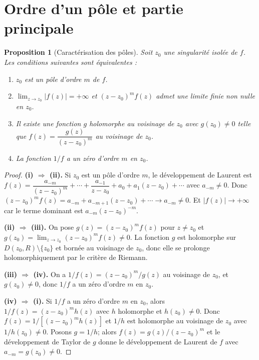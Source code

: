 \documentclass[12pt,a4paper,openany]{book}
\theoremstyle{definition}
\theoremstyle{plain}
\newtheorem{proposition}[definition]{Proposition}
\theoremstyle{remark}
\newcommand{\abs}[1]{\left|#1\right|}
\begin{document}
\section{Ordre d'un pôle et partie principale}

\begin{proposition}[Caractérisation des pôles]\label{prop:pole-char}
Soit $z_0$ une singularité isolée de $f$. Les conditions suivantes
sont équivalentes :
\begin{enumerate}[label=\textbf{(\roman*)}]
  \item $z_0$ est un pôle d'ordre $m$ de $f$.
  \item $\lim_{z \to z_0}\abs{f(z)} = +\infty$ et $(z-z_0)^m f(z)$
        admet une limite finie non nulle en $z_0$.
  \item Il existe une fonction $g$ holomorphe au voisinage de $z_0$
        avec $g(z_0) \neq 0$ telle que
        $f(z) = \dfrac{g(z)}{(z-z_0)^m}$ au voisinage de $z_0$.
  \item La fonction $1/f$ a un zéro d'ordre $m$ en $z_0$.
\end{enumerate}
\end{proposition}

\begin{proof}
\noindent\textbf{(i) $\Rightarrow$ (ii).} Si $z_0$ est un pôle d'ordre $m$,
le développement de Laurent est
$f(z) = \dfrac{a_{-m}}{(z-z_0)^m} + \cdots + \dfrac{a_{-1}}{z-z_0}
+ a_0 + a_1(z-z_0) + \cdots$
avec $a_{-m} \neq 0$. Donc
$(z-z_0)^m f(z) = a_{-m} + a_{-m+1}(z-z_0) + \cdots \to a_{-m} \neq 0$.
Et $\abs{f(z)} \to +\infty$ car le terme dominant est $a_{-m}(z-z_0)^{-m}$.

\medskip
\noindent\textbf{(ii) $\Rightarrow$ (iii).} On pose $g(z) = (z-z_0)^m f(z)$
pour $z \neq z_0$ et $g(z_0) = \lim_{z \to z_0}(z-z_0)^m f(z) \neq 0$.
La fonction $g$ est holomorphe sur $D(z_0,R)\setminus\{z_0\}$ et bornée
au voisinage de $z_0$, donc elle se prolonge holomorphiquement par le
critère de Riemann.

\medskip
\noindent\textbf{(iii) $\Rightarrow$ (iv).} On a $1/f(z) = (z-z_0)^m/g(z)$
au voisinage de $z_0$, et $g(z_0) \neq 0$, donc $1/f$ a un zéro d'ordre
$m$ en $z_0$.

\medskip
\noindent\textbf{(iv) $\Rightarrow$ (i).} Si $1/f$ a un zéro d'ordre $m$
en $z_0$, alors $1/f(z) = (z-z_0)^m h(z)$ avec $h$ holomorphe et
$h(z_0) \neq 0$. Donc $f(z) = 1/[(z-z_0)^m h(z)]$ et $1/h$ est
holomorphe au voisinage de $z_0$ avec $1/h(z_0) \neq 0$. Posons
$g = 1/h$; alors $f(z) = g(z)/(z-z_0)^m$ et le développement de Taylor
de $g$ donne le développement de Laurent de $f$ avec $a_{-m} = g(z_0) \neq 0$.
\end{proof}
\end{document}

